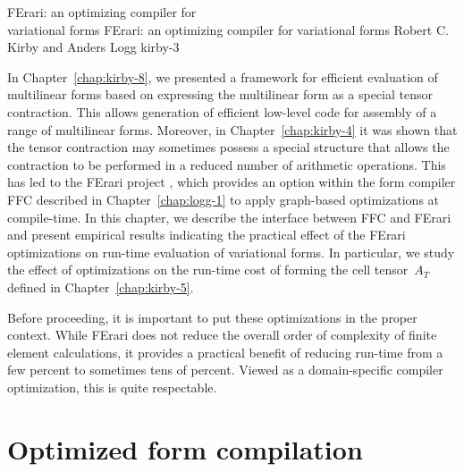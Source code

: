               {FErari: an optimizing compiler for \\ variational forms}
              {FErari: an optimizing compiler for variational forms}
              {Robert C. Kirby and Anders Logg}
              {kirby-3}

In Chapter~\ref{chap:kirby-8}, we presented a framework for efficient
evaluation of multilinear forms based on expressing the multilinear
form as a special tensor contraction. This allows generation of
efficient low-level code for assembly of a range of multilinear
forms. Moreover, in Chapter~\ref{chap:kirby-4} it was shown that the
tensor contraction may sometimes possess a special structure that
allows the contraction to be performed in a reduced number of
arithmetic operations. This has led to the FErari project
\citep{KirbyKnepleyLoggEtAl2005,KirbyLoggScottEtAl2006,KirbyScott2007,KirbyLogg2008},
which provides an option within the form compiler FFC described
in Chapter~\ref{chap:logg-1} to apply graph-based optimizations at
compile-time. In this chapter, we describe the interface between FFC and
FErari and present empirical results indicating the practical effect of
the FErari optimizations on run-time evaluation of variational forms. In
particular, we study the effect of optimizations on the run-time cost
of forming the cell tensor~$A_T$ defined in Chapter~\ref{chap:kirby-5}.

Before proceeding, it is important to put these optimizations in the
proper context. While FErari does not reduce the overall order of
complexity of finite element calculations, it provides a practical
benefit of reducing run-time from a few percent to sometimes tens of
percent. Viewed as a domain-specific compiler optimization, this is
quite respectable.

\section{Optimized form compilation}

